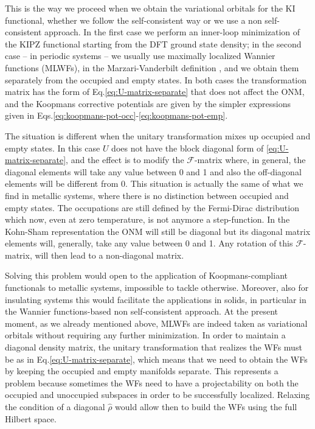 This is the way we proceed when we obtain the variational orbitals for the KI functional, whether we follow the self-consistent way or we use a non self-consistent approach. In the first case we perform an inner-loop minimization of the KIPZ functional starting from the DFT ground state density; in the second case -- in periodic systems -- we usually use maximally localized Wannier functions (MLWFs), in the Marzari-Vanderbilt definition \cite{marzari_maximally_2012}, and we obtain them separately from the occupied and empty states. In both cases the transformation matrix has the form of Eq.\eqref{eq:U-matrix-separate} that does not affect the ONM, and the Koopmans corrective potentials are given by the simpler expressions given in Eqs.\eqref{eq:koopmans-pot-occ}-\eqref{eq:koopmans-pot-emp}.

The situation is different when the unitary transformation mixes up occupied and empty states. In this case $U$ does not have the block diagonal form of \eqref{eq:U-matrix-separate}, and the effect is to modify the $\mathcal{F}$-matrix where, in general, the diagonal elements will take any value between 0 and 1 and also the off-diagonal elements will be different from 0. This situation is actually the same of what we find in metallic systems, where there is no distinction between occupied and empty states. The occupations are still defined by the Fermi-Dirac distribution which now, even at zero temperature, is not anymore a step-function. In the Kohn-Sham representation the ONM will still be diagonal but its diagonal matrix elements will, generally, take any value between 0 and 1. Any rotation of this $\mathcal{F}$-matrix, will then lead to a non-diagonal matrix.

Solving this problem would open to the application of Koopmans-compliant functionals to metallic systems, impossible to tackle otherwise. Moreover, also for insulating systems this would facilitate the applications in solids, in particular in the Wannier functions-based non self-consistent approach. At the present moment, as we already mentioned above, MLWFs are indeed taken as variational orbitals without requiring any further minimization. In order to maintain a diagonal density matrix, the unitary transformation that realizes the WFs must be as in Eq.\eqref{eq:U-matrix-separate}, which means that we need to obtain the WFs by keeping the occupied and empty manifolds separate. This represents a problem because sometimes the WFs need to have a projectability on both the occupied and unoccupied subspaces in order to be successfully localized. Relaxing the condition of a diagonal $\hat{\rho}$ would allow then to build the WFs using the full Hilbert space.

